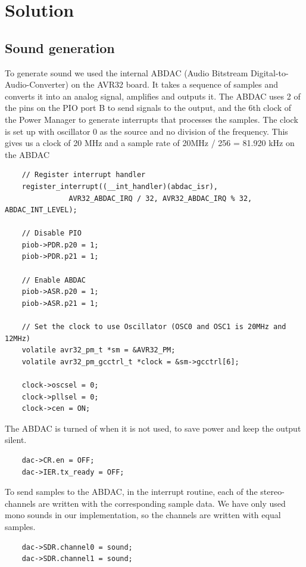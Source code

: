 \section{Solution}
\subsection{Sound generation}
To generate sound we used the internal ABDAC (Audio Bitstream Digital-to-Audio-Converter) on the AVR32 board. It takes a sequence of samples and converts it into an analog signal, amplifies and outputs it.
The ABDAC uses 2 of the pins on the PIO port B to send signals to the output, and the 6th clock of the Power Manager to generate interrupts that processes the samples. The clock is set up with oscillator 0 as the source and no division of the frequency. This gives us a clock of 20 MHz and a sample rate of 20MHz / 256 = 81.920 kHz on the ABDAC\\
\begin{lstlisting}
	// Register interrupt handler
	register_interrupt((__int_handler)(abdac_isr),
			   AVR32_ABDAC_IRQ / 32, AVR32_ABDAC_IRQ % 32, ABDAC_INT_LEVEL);

	// Disable PIO
	piob->PDR.p20 = 1;
	piob->PDR.p21 = 1;

	// Enable ABDAC
	piob->ASR.p20 = 1;
	piob->ASR.p21 = 1;

	// Set the clock to use Oscillator (OSC0 and OSC1 is 20MHz and 12MHz)
	volatile avr32_pm_t *sm = &AVR32_PM;
	volatile avr32_pm_gcctrl_t *clock = &sm->gcctrl[6];

	clock->oscsel = 0;
	clock->pllsel = 0;
	clock->cen = ON;
\end{lstlisting}
The ABDAC is turned of when it is not used, to save power and keep the output silent.\\
\begin{lstlisting}
	dac->CR.en = OFF;
	dac->IER.tx_ready = OFF;
\end{lstlisting}
To send samples to the ABDAC, in the interrupt routine, each of the stereo-channels are written with the corresponding sample data. We have only used mono sounds in our implementation, so the channels are written with equal samples.\\
\begin{lstlisting}
	dac->SDR.channel0 = sound;
	dac->SDR.channel1 = sound;
\end{lstlisting}
